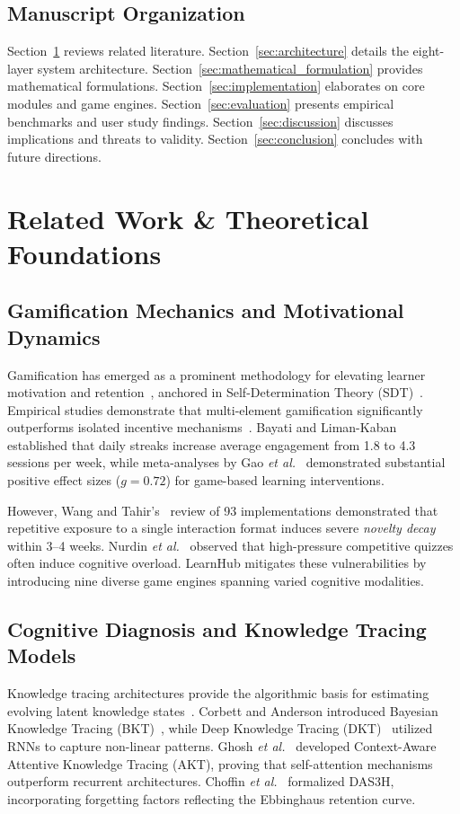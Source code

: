 \documentclass[journal]{IEEEtran}
\begin{document}
\subsection{Manuscript Organization}
Section~\ref{sec:related_work} reviews related literature. Section~\ref{sec:architecture} details the eight-layer system architecture. Section~\ref{sec:mathematical_formulation} provides mathematical formulations. Section~\ref{sec:implementation} elaborates on core modules and game engines. Section~\ref{sec:evaluation} presents empirical benchmarks and user study findings. Section~\ref{sec:discussion} discusses implications and threats to validity. Section~\ref{sec:conclusion} concludes with future directions.

\section{Related Work \& Theoretical Foundations}
\label{sec:related_work}
\subsection{Gamification Mechanics and Motivational Dynamics}
Gamification has emerged as a prominent methodology for elevating learner motivation and retention~\cite{khaldi2023, sailer2020}, anchored in Self-Determination Theory (SDT)~\cite{rizzo2024, ryan2000}. Empirical studies demonstrate that multi-element gamification significantly outperforms isolated incentive mechanisms~\cite{sailer2020}. Bayati and Liman-Kaban~\cite{bayati2024} established that daily streaks increase average engagement from 1.8 to 4.3 sessions per week, while meta-analyses by Gao \emph{et al.}~\cite{gao2024} demonstrated substantial positive effect sizes ($g = 0.72$) for game-based learning interventions.

However, Wang and Tahir's~\cite{wang2020} review of 93 implementations demonstrated that repetitive exposure to a single interaction format induces severe \emph{novelty decay} within 3--4 weeks. Nurdin \emph{et al.}~\cite{nurdin2023} observed that high-pressure competitive quizzes often induce cognitive overload. LearnHub mitigates these vulnerabilities by introducing nine diverse game engines spanning varied cognitive modalities.

\subsection{Cognitive Diagnosis and Knowledge Tracing Models}
Knowledge tracing architectures provide the algorithmic basis for estimating evolving latent knowledge states~\cite{ghosh2020}. Corbett and Anderson introduced Bayesian Knowledge Tracing (BKT)~\cite{corbett1994}, while Deep Knowledge Tracing (DKT)~\cite{piech2015} utilized RNNs to capture non-linear patterns. Ghosh \emph{et al.}~\cite{ghosh2020} developed Context-Aware Attentive Knowledge Tracing (AKT), proving that self-attention mechanisms outperform recurrent architectures. Choffin \emph{et al.}~\cite{choffin2019} formalized DAS3H, incorporating forgetting factors reflecting the Ebbinghaus retention curve.
\end{document}
